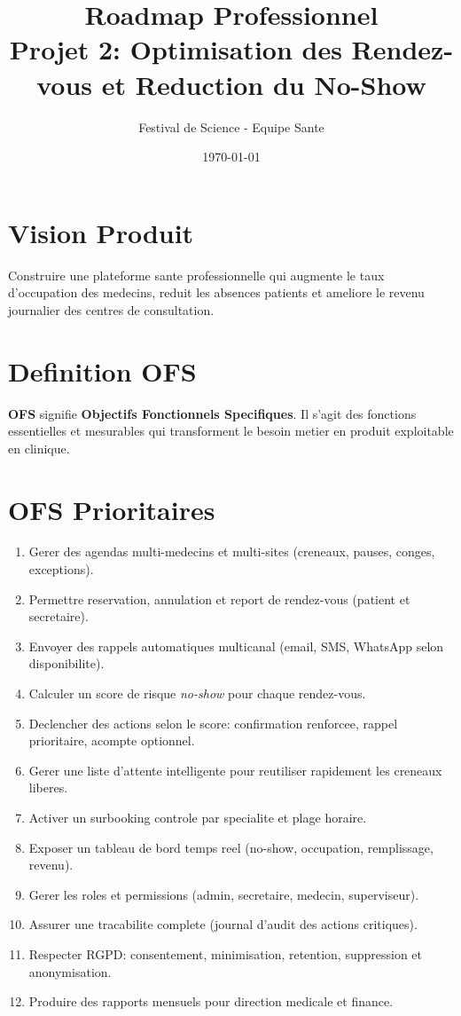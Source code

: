 \documentclass[11pt,a4paper]{article}
\title{Roadmap Professionnel\\Projet 2: Optimisation des Rendez-vous et Reduction du No-Show}
\author{Festival de Science - Equipe Sante}
\date{\today}
\begin{document}
\maketitle

\section*{Vision Produit}
Construire une plateforme sante professionnelle qui augmente le taux d'occupation des medecins,
reduit les absences patients et ameliore le revenu journalier des centres de consultation.

\section*{Definition OFS}
\textbf{OFS} signifie \textbf{Objectifs Fonctionnels Specifiques}. Il s'agit des fonctions essentielles
et mesurables qui transforment le besoin metier en produit exploitable en clinique.

\section*{OFS Prioritaires}
\begin{enumerate}[leftmargin=*]
  \item Gerer des agendas multi-medecins et multi-sites (creneaux, pauses, conges, exceptions).
  \item Permettre reservation, annulation et report de rendez-vous (patient et secretaire).
  \item Envoyer des rappels automatiques multicanal (email, SMS, WhatsApp selon disponibilite).
  \item Calculer un score de risque \textit{no-show} pour chaque rendez-vous.
  \item Declencher des actions selon le score: confirmation renforcee, rappel prioritaire, acompte optionnel.
  \item Gerer une liste d'attente intelligente pour reutiliser rapidement les creneaux liberes.
  \item Activer un surbooking controle par specialite et plage horaire.
  \item Exposer un tableau de bord temps reel (no-show, occupation, remplissage, revenu).
  \item Gerer les roles et permissions (admin, secretaire, medecin, superviseur).
  \item Assurer une tracabilite complete (journal d'audit des actions critiques).
  \item Respecter RGPD: consentement, minimisation, retention, suppression et anonymisation.
  \item Produire des rapports mensuels pour direction medicale et finance.
\end{enumerate}
\end{document}
